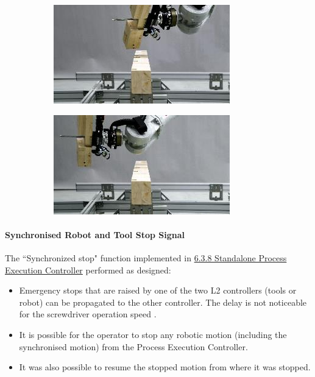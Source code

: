 \documentclass[11pt]{book}
\begin{document}
\begin{figure}[H]
\centering
\begin{subfigure}[b]{0.45\textwidth}
\centering
\includegraphics[width=\textwidth]{./images/image76.jpeg}
\end{subfigure}
\hfill
\begin{subfigure}[b]{0.45\textwidth}
\centering
\includegraphics[width=\textwidth]{./images/image77.jpeg}
\end{subfigure}
\end{figure}


\paragraph{Synchronised Robot and Tool Stop Signal}

The ``Synchronized stop" function implemented in \uline{6.3.8 Standalone Process Execution Controller} performed as designed:

\begin{itemize}
	\item Emergency stops that are raised by one of the two L2 controllers (tools or robot) can be propagated to the other controller. The delay is not noticeable for the screwdriver operation speed .

	\item It is possible for the operator to stop any robotic motion (including the synchronised motion) from the Process Execution Controller.

	\item It was also possible to resume the stopped motion from where it was stopped.

\end{itemize}
\end{document}
